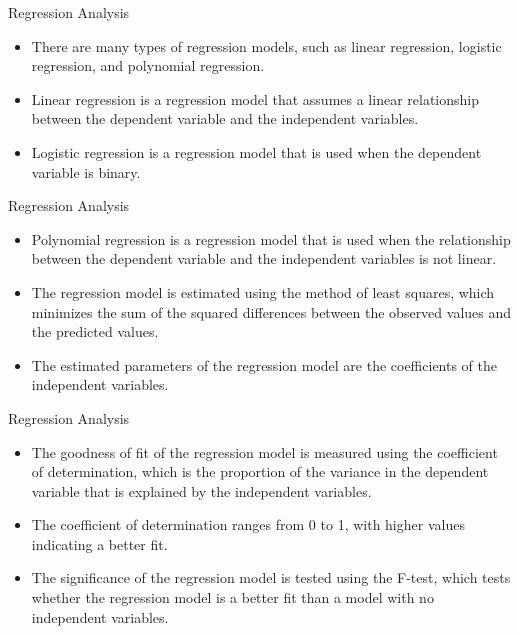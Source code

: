 \documentclass[serif, 9pt, aspectratio=32]{beamer}
\begin{document}
\begin{frame}{Regression Analysis}
    \begin{itemize}
        \setlength{\itemsep}{2em}
        \item There are many types of regression models, such as linear regression, logistic regression, and polynomial regression.
        \item Linear regression is a regression model that assumes a linear relationship between the dependent variable and the independent variables.
        \item Logistic regression is a regression model that is used when the dependent variable is binary.
    \end{itemize}
\end{frame}

\begin{frame}{Regression Analysis}
    \begin{itemize}
        \setlength{\itemsep}{2em}
        \item Polynomial regression is a regression model that is used when the relationship between the dependent variable and the independent variables is not linear.
        \item The regression model is estimated using the method of least squares, which minimizes the sum of the squared differences between the observed values and the predicted values.
        \item The estimated parameters of the regression model are the coefficients of the independent variables.
    \end{itemize}
\end{frame}

\begin{frame}{Regression Analysis}
    \begin{itemize}
        \setlength{\itemsep}{2em}
        \item The goodness of fit of the regression model is measured using the coefficient of determination, which is the proportion of the variance in the dependent variable that is explained by the independent variables.
        \item The coefficient of determination ranges from 0 to 1, with higher values indicating a better fit.
        \item The significance of the regression model is tested using the F-test, which tests whether the regression model is a better fit than a model with no independent variables.
    \end{itemize}
\end{frame}
\end{document}
